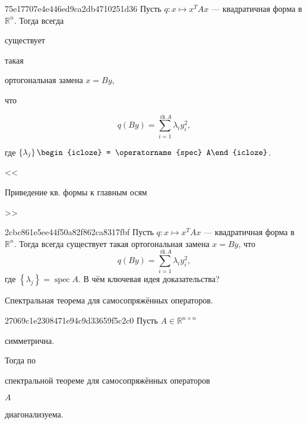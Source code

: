 \begin{note}{75e17707e4e446ed9ca2db4710251d36}
    Пусть \({ q : x \mapsto x^{T}Ax }\) --- квадратичная форма в \({ \mathbb R^{n} }\).
    Тогда всегда \begin{icloze}{4}существует\end{icloze} такая \begin{icloze}{3}ортогональная замена \({ x = By }\),\end{icloze} что
    \begin{icloze}{1}
        \[
            q(By) = \sum_{i=1}^{\operatorname{rk} A} \lambda_i y_i^2,
        \]
    \end{icloze}
    где \({ \left\{ \lambda_j \right\} \begin{icloze}{2}= \operatorname{spec} A\end{icloze} }\).

    \begin{center}
        \tiny
        <<\begin{icloze}{5}Приведение кв. формы к главным осям\end{icloze}>>
    \end{center}
\end{note}

\begin{note}{2cbc861e5ee44f50a82f862ca8317fbf}
    Пусть \({ q : x \mapsto x^{T}Ax }\) --- квадратичная форма в \({ \mathbb R^{n} }\).
    Тогда всегда существует такая ортогональная замена \({ x = By }\), что
    \[
        q(By) = \sum_{i=1}^{\operatorname{rk} A} \lambda_i y_i^2,
    \]
    где \({ \left\{ \lambda_j \right\} = \operatorname{spec} A }\).
    В чём ключевая идея доказательства?

    \begin{cloze}{1}
        Спектральная теорема для самосопряжённых операторов.
    \end{cloze}
\end{note}

\begin{note}{27069c1e2308471e94c9d33659f5c2c0}
    Пусть \({ A \in \mathbb R^{n \times n} }\) \begin{icloze}{2}симметрична.\end{icloze}
    Тогда по \begin{icloze}{3}спектральной теореме для самосопряжённых операторов\end{icloze} \({ A }\) \begin{icloze}{1}диагонализуема.\end{icloze}
\end{note}

